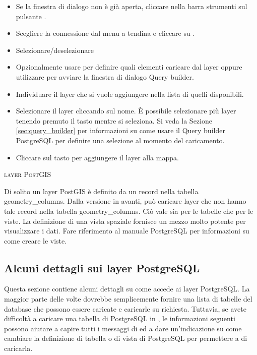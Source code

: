 \begin{itemize}[label=--]
\item Se la finestra di dialogo  non è già
aperta, cliccare nella barra strumenti sul pulsante
 .
\item Scegliere la connessione dal menu a tendina e cliccare su .
\item Selezionare/deselezionare 
\item Opzionalmente usare  per definire quali elementi 
caricare dal layer oppure utilizzare  per avviare la finestra 
di dialogo Query builder.
\item Individuare il layer che si vuole aggiungere nella lista di quelli disponibili.
\item Selezionare il layer cliccando sul nome. È possibile selezionare più layer
tenendo premuto il tasto  mentre si seleziona. Si veda la
Sezione \ref{sec:query_builder} per informazioni su come usare il Query builder 
PostgreSQL per definire una selezione al momento del caricamento.
\item Cliccare sul tasto  per aggiungere il layer alla mappa.
\end{itemize}

\begin{Tip}\caption{\textsc{layer PostGIS}}
Di solito un layer PostGIS è definito da un record nella tabella
geometry\_columns. Dalla versione \OLD %
in avanti, \qg può caricare layer che non hanno tale record nella tabella
geometry\_columns. Ciò vale sia per le tabelle che per le viste. La
definizione di una vista spaziale fornisce un mezzo molto potente per
visualizzare i dati. Fare riferimento al manuale PostgreSQL per informazioni
su come creare le viste.
\end{Tip}

\subsection{Alcuni dettagli sui layer PostgreSQL}\label{sec:postgis_details}

Questa sezione contiene alcuni dettagli su come \qg accede ai layer
PostgreSQL. La maggior parte delle volte \qg dovrebbe semplicemente fornire
una lista di tabelle del database che possono essere caricate e caricarle su
richiesta. Tuttavia, se avete difficoltà a caricare una tabella di PostgreSQL
in \qg, le informazioni seguenti possono aiutare a capire tutti i messaggi 
di \qg ed a dare un'indicazione su come cambiare la definizione di tabella o 
di vista di PostgreSQL per permettere a \qg di caricarla.

